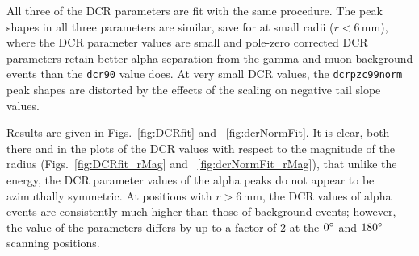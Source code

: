 All three of the DCR parameters are fit with the same procedure. The peak shapes in all three parameters are similar, save for at small radii ($r<6$\,mm), where the DCR parameter values are small and pole-zero corrected DCR parameters retain better alpha separation from the gamma and muon background events than the {\tt dcr90} value does. At very small DCR values, the {\tt dcrpzc99norm} peak shapes are distorted by the effects of the scaling on negative tail slope values. 

Results are given in Figs.~\ref{fig:DCRfit} and ~\ref{fig:dcrNormFit}. It is clear, both there and in the plots of the DCR values with respect to the magnitude of the radius (Figs.~\ref{fig:DCRfit_rMag} and ~\ref{fig:dcrNormFit_rMag}), that unlike the energy, the DCR parameter values of the alpha peaks do not appear to be azimuthally symmetric. At positions with $r>6$\,mm, the DCR values of alpha events are consistently much higher than those of background events; however, the value of the parameters differs by up to a factor of 2 at the $0\degree$ and $180\degree$ scanning positions. 

